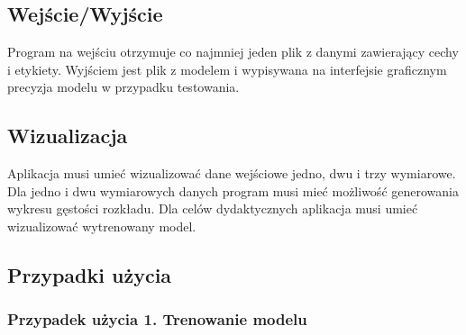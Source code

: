 \documentclass[paper=a4, fontsize=11pt]{scrartcl} %
\numberwithin{equation}{section} %
\numberwithin{figure}{section} %
\begin{document}
\subsection{Wejście/Wyjście}
    \par Program na wejściu otrzymuje co najmniej jeden plik z danymi zawierający cechy i
    etykiety. Wyjściem jest plik z modelem i wypisywana na interfejsie graficznym precyzja
    modelu w przypadku testowania. 

\subsection{Wizualizacja}
    \par Aplikacja musi umieć wizualizować dane wejściowe jedno, dwu i trzy wymiarowe. Dla
    jedno i dwu wymiarowych danych program musi mieć możliwość generowania wykresu gęstości
    rozkładu. Dla celów dydaktycznych aplikacja musi umieć wizualizować wytrenowany model.

\subsection{Przypadki użycia}
\subsubsection{Przypadek użycia 1. Trenowanie modelu}
\end{document}
